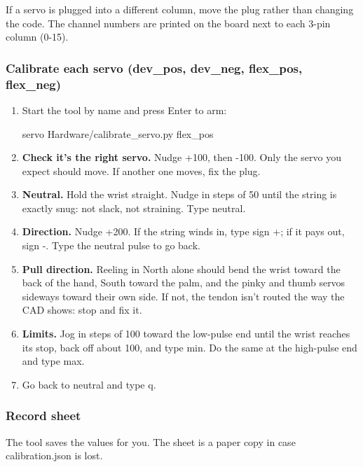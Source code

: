 \documentclass[11pt,letterpaper]{article}
\newcommand{\code}[1]{\textcolor{codeblue}{\ttfamily\smaller\relax #1}}
\begin{document}
If a servo is plugged into a different column, move the plug rather than changing the code. The channel numbers are printed on the board next to each 3-pin column (0-15).


\subsubsection*{Calibrate each servo (dev\_pos, dev\_neg, flex\_pos, flex\_neg)}
\begin{enumerate}
  \item Start the tool by name and press Enter to arm:
\begin{codeblock}
servo Hardware/calibrate_servo.py flex_pos
\end{codeblock}
  \item \textbf{Check it's the right servo.} Nudge \code{+100}, then \code{-{}100}. Only the servo you expect should move. If another one moves, fix the plug.
  \item \textbf{Neutral.} Hold the wrist straight. Nudge in steps of 50 until the string is exactly snug: not slack, not straining. Type \code{neutral}.
  \item \textbf{Direction.} Nudge \code{+200}. If the string winds in, type \code{sign +}; if it pays out, \code{sign -{}}. Type the neutral pulse to go back.
  \item \textbf{Pull direction.} Reeling in North alone should bend the wrist toward the back of the hand, South toward the palm, and the pinky and thumb servos sideways toward their own side. If not, the tendon isn't routed the way the CAD shows: stop and fix it.
  \item \textbf{Limits.} Jog in steps of 100 toward the low-pulse end until the wrist reaches its stop, back off about 100, and type \code{min}. Do the same at the high-pulse end and type \code{max}.
  \item Go back to neutral and type \code{q}.
\end{enumerate}


\subsubsection*{Record sheet}
The tool saves the values for you. The sheet is a paper copy in case \code{calibration.json} is lost.
\end{document}
